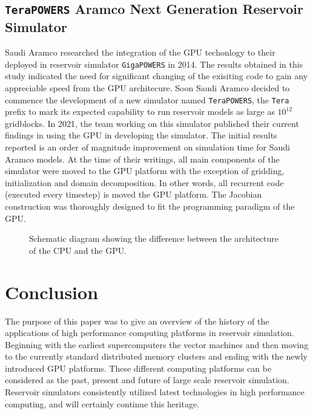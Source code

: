 \documentclass[barcolor=BrickRed,nocopyright,nolists]{asmejour}
\begin{document}
\subsection{\texttt{TeraPOWERS} Aramco Next Generation Reservoir Simulator}
Saudi Aramco researched the integration of the GPU techonlogy to their deployed in reservoir simulator \texttt{GigaPOWERS} in 2014\cite{spe163591}. The results obtained in this study indicated the need for significant changing of the exisiting code to gain any appreciable speed from the GPU architecure. Soon Saudi Aramco decided to commence the development of
a new simulator named \texttt{TeraPOWERS}, the \texttt{Tera} prefix to mark its expected capability to run reservoir models as large as $10^{12}$ gridblocks. In 2021, the team working on this simulator published their current findings in using the GPU in developing the simulator\cite{spe203918}. The initial results reported is an order of magnitude improvement
on simulation time for Saudi Aramco models. At the time of their writings, all main components of the simulator were moved to the GPU platform with the exception of gridding, initialization and domain decomposition. In other words, all recurrent code (executed every timestep) is moved the GPU platform. The Jacobian construction was thoroughly designed to fit the
programming paradigm of the GPU.

\begin{figure}[h]
	\centering\scalebox{0.6}{}
	\caption{Schematic diagram showing the difference between the architecture of the CPU and the GPU.}
	\label{gpu}
\end{figure}
	
\section{Conclusion}
The purpose of this paper was to give an overview of the history of the applications of high performance computing platforms in reservoir simulation. Beginning with the earliest supercomputers the vector machines and then moving to the currently standard distributed memory clusters and ending with the newly introduced GPU platforms. These different computing
platforms can be considered as the past, present and future of large scale reservoir simulation. Reservoir simulators consistently utilized latest technologies in high performance computing, and will certainly continue this heritage.


\nocite{*} %




\end{document}
